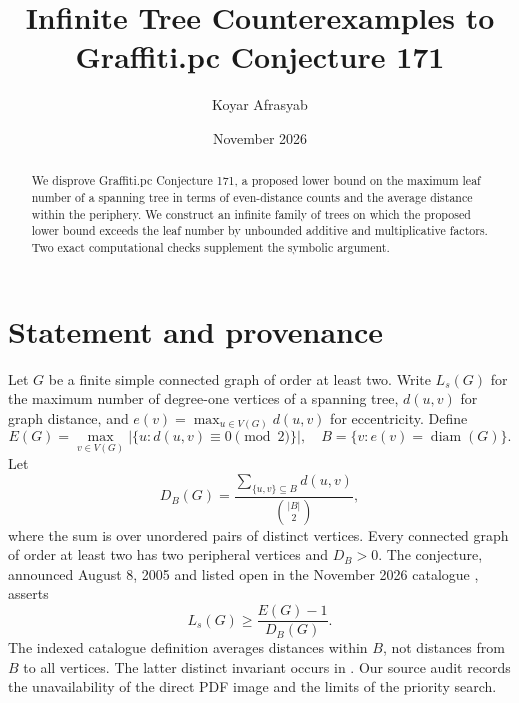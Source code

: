 \documentclass[11pt]{article}
\title{Infinite Tree Counterexamples to Graffiti.pc Conjecture 171}
\author{Koyar Afrasyab}
\date{November 2026}
\begin{document}
\maketitle
\begin{abstract}
We disprove Graffiti.pc Conjecture 171, a proposed lower bound on the maximum leaf number of a spanning tree in terms of even-distance counts and the average distance within the periphery. We construct an infinite family of trees on which the proposed lower bound exceeds the leaf number by unbounded additive and multiplicative factors. Two exact computational checks supplement the symbolic argument.
\end{abstract}
\section{Statement and provenance}
Let $G$ be a finite simple connected graph of order at least two. Write $L_s(G)$ for the maximum number of degree-one vertices of a spanning tree, $d(u,v)$ for graph distance, and $e(v)=\max_{u\in V(G)}d(u,v)$ for eccentricity. Define
\[
 E(G)=\max_{v\in V(G)}|\{u:d(u,v)\equiv0\pmod2\}|,
 \quad B=\{v:e(v)=\operatorname{diam}(G)\}.
\]
Let
\[
 D_B(G)=\frac{\sum_{\{u,v\}\subseteq B}d(u,v)}{\binom{|B|}{2}},
\]
where the sum is over unordered pairs of distinct vertices. Every connected graph of order at least two has two peripheral vertices and $D_B>0$. The conjecture, announced August 8, 2005 and listed open in the November 2026 catalogue \cite{wow}, asserts
\begin{equation}
 L_s(G)\ge\frac{E(G)-1}{D_B(G)}. \label{conj}
\end{equation}
The indexed catalogue definition averages distances within $B$, not distances from $B$ to all vertices. The latter distinct invariant occurs in \cite{dw}. Our source audit records the unavailability of the direct PDF image and the limits of the priority search.
\end{document}
